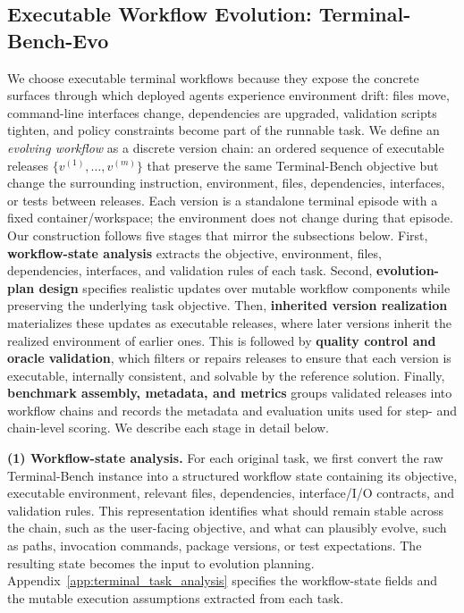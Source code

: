 \documentclass{llmxive}
\begin{document}
\subsection{Executable Workflow Evolution: Terminal-Bench-Evo}
\label{sec:terminal_bench_evo}

We choose executable terminal workflows because they expose the concrete surfaces through which deployed agents experience environment drift: files move, command-line interfaces change, dependencies are upgraded, validation scripts tighten, and policy constraints become part of the runnable task. We define an \emph{evolving workflow} as a discrete version chain: an ordered sequence of executable releases $\{v^{(1)}, \ldots, v^{(m)}\}$ that preserve the same Terminal-Bench objective \cite{terminal-bench} but change the surrounding instruction, environment, files, dependencies, interfaces, or tests between releases. Each version is a standalone terminal episode with a fixed container/workspace; the environment does not change during that episode. 
Our construction follows five stages that mirror the subsections below. First, \textbf{workflow-state analysis} extracts the objective, environment, files, dependencies, interfaces, and validation rules of each task. Second, \textbf{evolution-plan design} specifies realistic updates over mutable workflow components while preserving the underlying task objective. Then, \textbf{inherited version realization} materializes these updates as executable releases, where later versions inherit the realized environment of earlier ones. This is followed by \textbf{quality control and oracle validation}, which filters or repairs releases to ensure that each version is executable, internally consistent, and solvable by the reference solution. Finally, \textbf{benchmark assembly, metadata, and metrics} groups validated releases into workflow chains and records the metadata and evaluation units used for step- and chain-level scoring.
We describe each stage in detail below.






\textbf{(1) Workflow-state analysis.} \noindent
For each original task, we first convert the raw Terminal-Bench instance into a structured workflow state containing its objective, executable environment, relevant files, dependencies, interface/I/O contracts, and validation rules. This representation identifies what should remain stable across the chain, such as the user-facing objective, and what can plausibly evolve, such as paths, invocation commands, package versions, or test expectations. The resulting state becomes the input to evolution planning. Appendix~\ref{app:terminal_task_analysis} specifies the workflow-state fields and the mutable execution assumptions extracted from each task.
\end{document}
